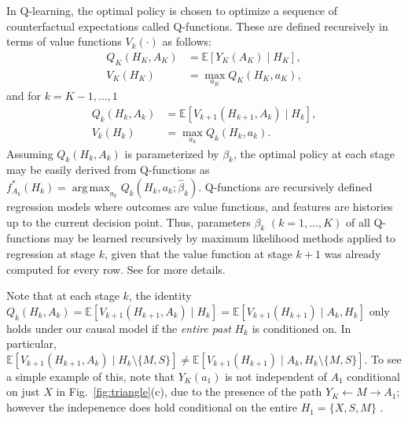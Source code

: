 \documentclass{article}
\newcommand{\E}{\mathbb{E}}
\DeclareMathOperator*{\argmax}{arg\,max}
\begin{document}
In Q-learning, the optimal policy is chosen to optimize a sequence of counterfactual expectations called Q-functions.
These are defined recursively in terms of value functions $V_k(\cdot)$ as follows:
{\small
\begin{align}
Q_K(H_K, A_K) &= \E[Y_K(A_K) \mid H_K],  \nonumber \\
 V_K(H_K) &= \max_{a_K} Q_K(H_K, a_K), 
 \label{eq:QK}
\end{align}
}
and for $k = K-1, \ldots, 1$  
{\small
\begin{align}
Q_k(H_k, A_k) &= \E[V_{k+1}(H_{k+1},A_k) \mid H_k], \nonumber \\
 V_k(H_k)  &=  \max_{a_k} Q_k(H_k, a_k).
 \label{eq:Qi}
\end{align}
}%
Assuming $Q_k(H_k, A_k)$ is parameterized by $\beta_k$, the optimal policy at each stage may be easily derived from Q-functions as
$f^*_{A_k}(H_k) = \argmax_{a_k} {Q}_k(H_k, a_k; \widehat{\beta}_k)$.
Q-functions are recursively defined regression models where outcomes are value functions, and features are histories up to the current decision point.  Thus, parameters $\beta_k$ $(k=1,\ldots,K)$ of all Q-functions may be learned recursively by maximum likelihood methods applied to regression at stage $k$, given that the value function at stage $k+1$ was already computed for every row. See \citet{Moodie13DTR} for more details.

Note that at each stage $k$, the identity
$Q_k(H_k, A_k) = \E[V_{k+1}(H_{k+1},A_k) \mid H_k] = \E[V_{k+1}(H_{k+1}) \mid A_k, H_k]$ only holds under our causal model if the \emph{entire past} $H_k$ is conditioned on.  In particular, $\E[V_{k+1}(H_{k+1},A_k) \mid H_k \setminus \{ M, S \} ] \neq \E[V_{k+1}(H_{k+1}) \mid A_k, H_k \setminus \{M, S \} ]$.  To see a simple example of this, note that $Y_K(a_1)$ is not independent of $A_1$ conditional on just $X$ in Fig.~\ref{fig:triangle}(c), due to the presence of the path $Y_K \gets M \to A_1$; however the indepenence does hold conditional on the entire $H_1 = \{X, S, M\}$ \cite{thomas13swig}.
\end{document}
